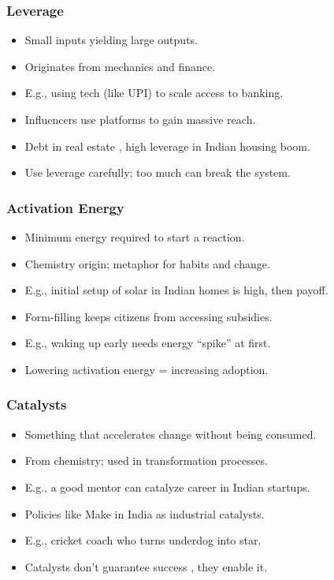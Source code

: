 \begin{frame}[fragile]\frametitle{Leverage}
  \begin{itemize}
    \item Small inputs yielding large outputs.
    \item Originates from mechanics and finance.
    \item E.g., using tech (like UPI) to scale access to banking.
    \item Influencers use platforms to gain massive reach.
    \item Debt in real estate , high leverage in Indian housing boom.
    \item Use leverage carefully; too much can break the system.
  \end{itemize}
\end{frame}

\begin{frame}[fragile]\frametitle{Activation Energy}
  \begin{itemize}
    \item Minimum energy required to start a reaction.
    \item Chemistry origin; metaphor for habits and change.
    \item E.g., initial setup of solar in Indian homes is high, then payoff.
    \item Form-filling keeps citizens from accessing subsidies.
    \item E.g., waking up early needs energy ``spike'' at first.
    \item Lowering activation energy = increasing adoption.
  \end{itemize}
\end{frame}

\begin{frame}[fragile]\frametitle{Catalysts}
  \begin{itemize}
    \item Something that accelerates change without being consumed.
    \item From chemistry; used in transformation processes.
    \item E.g., a good mentor can catalyze career in Indian startups.
    \item Policies like Make in India as industrial catalysts.
    \item E.g., cricket coach who turns underdog into star.
    \item Catalysts don't guarantee success , they enable it.
  \end{itemize}
\end{frame}

